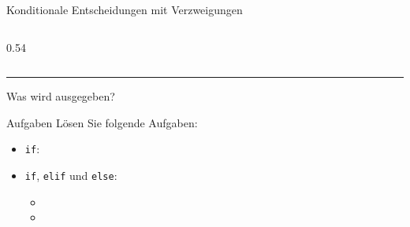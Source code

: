 \begin{frame}[fragile]{Konditionale Entscheidungen mit Verzweigungen}
    \begin{columns}
        \begin{column}{0.54\textwidth}
            
        \end{column}
    \end{columns}


    \vspace{0.5cm}
    \rule{\textwidth}{.5pt}
    \begin{center}
        Was wird ausgegeben?
    \end{center}
\end{frame}



\begin{frame}{Aufgaben}
    Lösen Sie folgende Aufgaben:
    \begin{itemize}
        \item \lstinline|if|: 
        \item \lstinline|if|, \lstinline|elif| und \lstinline|else|:
              \begin{itemize}
                  \item {}
                  \item {}
              \end{itemize}
    \end{itemize}
\end{frame}
